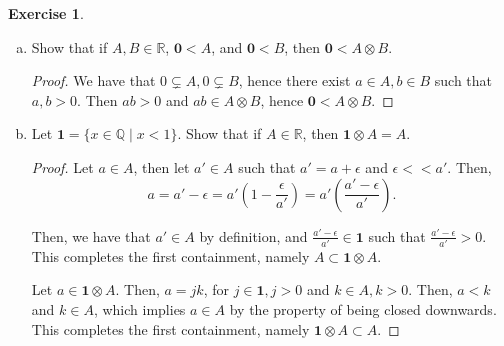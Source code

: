 \documentclass[11pt]{article}
\newcommand{\bbQ}{\mathbb{Q}}
\newcommand{\bbR}{\mathbb{R}}
\theoremstyle{definition}
\newtheorem{exercise}[theorem]{Exercise}
\numberwithin{equation}{subsection}
\begin{document}
\begin{exercise}
\begin{enumerate}[(a)]
\begin{proof}
Next, we want to show that $(A\otimes B)\otimes C=A \otimes (B \otimes C)$. Let $x \in (A\otimes B)\otimes C$. 

Case 1: $x \leq 0$. Then, $x \in \{r\in\bbQ\mid r\leq 0\}$, hence $x \in A \otimes (B \otimes C)$. 

Case 2: $x>0$. Then, $x=dc$, where $d\in A \otimes B, c\in C$, $d>0,c>0$. Further, $d=ab$ for $a\in A,b\in B$ such that $a,b>0$. Let $y=bc$, then $y \in B\otimes C$. Then, $x=ay$, hence $x\in A \otimes (B\otimes C)$. 

This completes the first containment. The second containment is analogous.

\renewcommand\qedsymbol{QED}
\end{proof}

        \item Show that if $A, B \in \bbR$, $\mathbf{0} < A$, and $\mathbf{0} < B$, then $\mathbf{0} < A\otimes B$. 
		        
\begin{proof}
We have that $0 \subsetneq A, 0 \subsetneq B$, hence there exist $a\in A,b\in B$ such that $a,b>0$. Then $ab>0$ and $ab\in A \otimes B$, hence $\mathbf{0}<A \otimes B$.

\renewcommand\qedsymbol{QED}
\end{proof}

        \item Let $\mathbf{1} = \{x \in \bbQ \mid x < 1\}$. Show that if $A \in \bbR$, then $\mathbf{1} \otimes A = A$. 
	        
\begin{proof}
Let $a \in A$, then let $a'\in A$ such that $a'=a+\epsilon$ and $\epsilon << a'$. Then, \[
a=a'-\epsilon = a'(1-\frac{\epsilon}{a'}) = a'(\frac{a'-\epsilon}{a'}).
\]

Then, we have that $a' \in A$ by definition, and $\frac{a'-\epsilon}{a'} \in \mathbf{1}$ such that $\frac{a'-\epsilon}{a'}>0$. This completes the first containment, namely $A \subset \mathbf{1} \otimes A$.

Let $a \in \mathbf{1} \otimes A$. Then, $a = jk$, for $j\in \mathbf{1},j>0$ and $k \in A, k>0$. Then, $a<k$ and $k\in A$, which implies $a \in A$ by the property of being closed downwards. This completes the first containment, namely $\mathbf{1} \otimes A \subset A$.

\renewcommand\qedsymbol{QED}
\end{proof}

    \end{enumerate}
\end{exercise}
\end{document}
